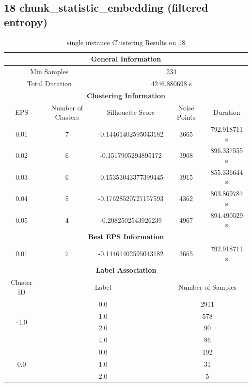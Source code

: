 \subsection{18 chunk\_statistic\_embedding (filtered entropy)}

\begin{longtable}{|c|c|c|c|c|}
\caption{single instance Clustering Results on 18} \label{tab:18_single_instance_clustering_results}\\
\hline
\multicolumn{5}{|c|}{\textbf{General Information}} \\
\hline
\multicolumn{2}{|c|}{Min Samples} & \multicolumn{3}{c|}{234} \\
\multicolumn{2}{|c|}{Total Duration} & \multicolumn{3}{c|}{4246.880698 s} \\
\hline
\multicolumn{5}{|c|}{\textbf{Clustering Information}} \\
\hline
EPS & Number of Clusters & Silhouette Score & Noise Points & Duration \\
0.01 & 7 & -0.14461402595043182 & 3665 & 792.918711 s\\
0.02 & 6 & -0.1517905294895172 & 3908 & 896.337555 s\\
0.03 & 6 & -0.15353043377399445 & 3915 & 855.336644 s\\
0.04 & 5 & -0.17628520727157593 & 4362 & 803.869787 s\\
0.05 & 4 & -0.2082502543926239 & 4967 & 894.490529 s\\
\hline
\multicolumn{5}{|c|}{\textbf{Best EPS Information}} \\
\hline
0.01 & 7 & -0.14461402595043182 & 3665 & 792.918711 s\\
\hline
\multicolumn{5}{|c|}{\textbf{Label Association}} \\
\hline
Cluster ID & \multicolumn{2}{c|}{Label} & \multicolumn{2}{c|}{Number of Samples} \\
\hline
\multirow{4}{*}{-1.0} & \multicolumn{2}{c|}{0.0} & \multicolumn{2}{c|}{2911} \\
& \multicolumn{2}{c|}{1.0} & \multicolumn{2}{c|}{578} \\
& \multicolumn{2}{c|}{2.0} & \multicolumn{2}{c|}{90} \\
& \multicolumn{2}{c|}{4.0} & \multicolumn{2}{c|}{86} \\
\hline
\multirow{4}{*}{0.0} & \multicolumn{2}{c|}{0.0} & \multicolumn{2}{c|}{192} \\
& \multicolumn{2}{c|}{1.0} & \multicolumn{2}{c|}{31} \\
& \multicolumn{2}{c|}{2.0} & \multicolumn{2}{c|}{5} \\

\end{longtable}
